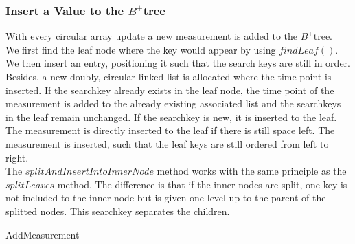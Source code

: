 \documentclass[abstracton,12pt]{scrreprt}
\begin{document}
\subsubsection{Insert a Value to the $B^+$tree}
With every circular array update a new measurement is added to the $B^+$tree.\\
We first find the leaf node where the key would
appear by using $findLeaf()$. We then insert an entry, positioning it such that the search keys are still in order. Besides, a new doubly, circular linked list is allocated where the time point is inserted. If the searchkey already exists in the leaf node, the time point of the measurement is added to the already existing associated list and the searchkeys in the leaf remain unchanged. If the searchkey is new, it is inserted to the leaf. \\
The measurement is directly inserted to the leaf if there is still space left. The measurement is inserted, such that the leaf keys are still ordered from left to right. \\
The $splitAndInsertIntoInnerNode$ method works with the same principle as the $splitLeaves$ method. The difference is that if the inner nodes are split, one key is not included to the inner node but is given one level up to the parent of the splitted nodes. This searchkey separates the children. \\
\begin{algorithm}[H]
	\IncMargin{1em}
	\SetAlgoLined
	\DontPrintSemicolon
	
	
	

	\caption{AddMeasurement}	\label{AddMeasurement}
\end{algorithm}
\end{document}
